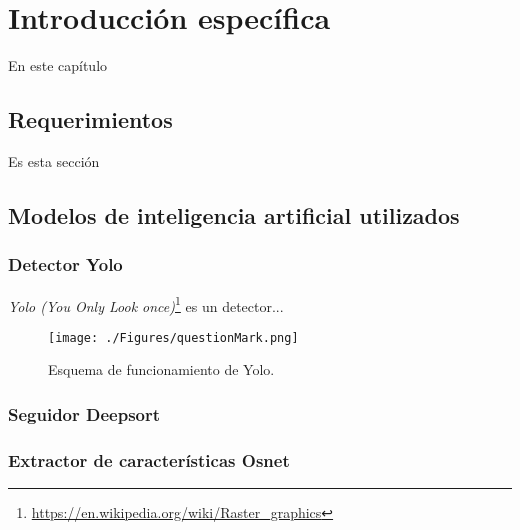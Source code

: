 \chapter{Introducción específica} %

\label{Chapter2}

En este capítulo


\section{Requerimientos}
\label{sec:requerimientos}

Es esta sección


\section{Modelos de inteligencia artificial utilizados}
\label{sec:modelosIA}

\subsection{Detector Yolo}

\textit{Yolo (You Only Look once)}\footnote{\url{https://en.wikipedia.org/wiki/Raster_graphics}} es un detector...


\begin{figure}[ht]
	\centering
	\texttt{[image: ./Figures/questionMark.png]}
	\caption{Esquema de funcionamiento de Yolo.}
	\label{fig:diagramaYolo}
\end{figure}



\subsection{Seguidor Deepsort}

\subsection{Extractor de características Osnet}
\label{sec:exactorOsnet}

